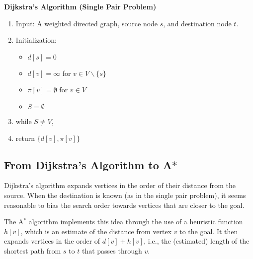 \begin{algorithm_}\textbf{Dijkstra's Algorithm (Single Pair Problem)}
\begin{enumerate}
\item{Input:} A weighted directed graph, source node $s$, and destination node $t$.

\item Initialization:
\begin{itemize}
  \item[] $d[s] = 0$
  \item[] $d[v] = \infty $ for $v \in V\backslash \{ s\} $
  \item[] $\pi [v] = \emptyset $ for $v \in V$
  \item[] $S = \emptyset $
\end{itemize}

\item while $S \ne V$,





\item return $\{ d[v],\pi [v]\} $
\end{enumerate}
\end{algorithm_}

\subsection{From Dijkstra's Algorithm to A$*$}

Dijkstra's algorithm expands vertices in the order of their distance from the source. When the destination is known (as in the single pair problem), it seems reasonable to bias the search order towards vertices that are closer to the goal. 

The A$^*$ algorithm implements this idea through the use of a heuristic function $h[v]$, which is an estimate of the distance from vertex $v$ to the goal. It then expands vertices in the order of $d[v] + h[v]$, i.e., the (estimated) length of the shortest path from $s$ to $t$ that passes through $v$.

